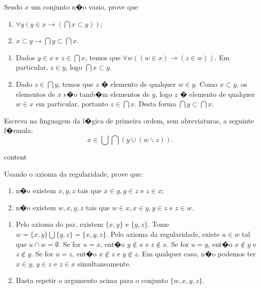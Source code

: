 \begin{exercicio}
	Sendo $x$ um conjunto n�o vazio, prove que
	\begin{enumerate}[label=(\alph{*})]
		\item $\forall y(y\in x\to(\bigcap x\subset y))$;
		\item $x\subset y\to \bigcap y\subset \bigcap x$.
	\end{enumerate}
\end{exercicio}
\begin{solucao}
	\begin{enumerate}[label=(\alph{*})]
		\item Dados $y\in x$ e $z\in\bigcap x$, temos que $\forall w((w\in x)\to(z\in w))$. Em particular, $z\in y$, logo $\bigcap x\subset y$.
		\item Dado $z\in\bigcap y$, temos que $z$ � elemento de qualquer $w\in y$. Como $x\subset y$, os elementos de $x$ s�o tamb�m elementos de  $y$, logo $z$ � elemento de qualquer $w\in x$ em particular, portanto $z\in\bigcap x$. Desta forma $\bigcap y\subset\bigcap x$.
	\end{enumerate}
\end{solucao}

\begin{exercicio}
	Escreva na linguagem da l�gica de primeira ordem, sem abreviaturas, a seguinte f�rmula:
	$$x\in\bigcup\bigcap(y\cup(w\backslash z)).$$
\end{exercicio}
\begin{solucao}
	content
\end{solucao}

\begin{exercicio}
	Usando o axioma da regularidade, prove que:
	\begin{enumerate}[label=(\alph{*})]
		\item n�o existem $x,y,z$ tais que $x\in y,y\in z$ e $z\in x$;
		\item n�o existem $w,x,y,z$ tais que $w\in x,x\in y,y\in z$ e $z\in w$.
	\end{enumerate}
\end{exercicio}
\begin{solucao}
	\begin{enumerate}[label=(\alph{*})]
		\item Pelo axioma do par, existem $\{x,y\}$ e $\{y,z\}$. Tome $w=\{x,y\}\bigcup \{y,z\}=\{x,y,z\}$. Pelo axioma da regularidade, existe $u\in w$ tal que $u\cap w=\emptyset$. Se for $u=x$, ent�o $y\notin x$ e $z\notin x$. Se for $u=y$, ent�o $x\notin y$ e $z\notin y$. Se for $u=z$, ent�o $x\notin z$ e $y\notin z$. Em qualquer caso, n�o podemos ter $x\in y$, $y\in z$ e $z\in x$ simultaneamente.
		\item Basta repetir o argumento acima para o conjunto $\{w,x,y,z\}$.
	\end{enumerate}
\end{solucao}

